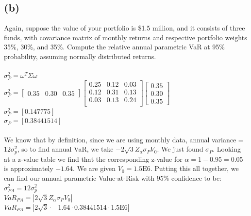 \documentclass{article}
\begin{document}
{\subsection*{(b)}

Again, suppose the value of your portfolio is \$1.5 million, and it consists of three funds, with covariance matrix of monthly returns and respective portfolio weights 35\%, 30\%, and 35\%. Compute the relative annual parametric VaR at 95\% probability, assuming normally distributed returns. \\ \\

$\sigma_P^2 = \omega^T \Sigma \omega$ \\
$\sigma_P^2 = 
\begin{bmatrix}
  0.35 & 0.30 & 0.35
\end{bmatrix}
\begin{bmatrix}
  0.25 & 0.12 & 0.03 \\
  0.12 & 0.31 & 0.13 \\
  0.03 & 0.13 & 0.24 \\
\end{bmatrix}
\begin{bmatrix}
  0.35 \\
  0.30 \\
  0.35
\end{bmatrix}$ \\
$\sigma_P^2 = [0.147775]$ \\
$\sigma_P = [0.38441514]$ \\ \\
We know that by definition, since we are using monthly data, annual variance = $12 \sigma_p^2$, so to find annual VaR, we take $-2\sqrt{3}Z_\alpha \sigma_P V_0$. We just found $\sigma_P$. Looking at a z-value table we find that the corresponding z-value for $\alpha = 1 - 0.95 = 0.05$ is approximately $-1.64$. We are given $V_0 = 1.5\text{E6}$. Putting this all together, we can find our annual parametric Value-at-Risk with 95\% confidence to be: \\
$\sigma_{PA}^2 = 12 \sigma_p^2$ \\
$VaR_{PA} = |2\sqrt{3} Z_\alpha \sigma_P V_0|$ \\
$VaR_{PA} = |2\sqrt{3} \cdot -1.64 \cdot 0.38441514 \cdot 1.5\text{E6}|$ \\

}
\end{document}
